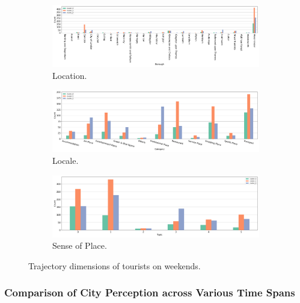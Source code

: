 \documentclass{article}
\theoremstyle{remark}
\begin{document}
\begin{figure}[!h]

\centering
\begin{subfigure}{0.6\textheight}
\centering
\includegraphics[width=1\linewidth]{figures/traj_location_weekend_tourists.png}
\caption{Location.}
\label{fig:traj_location_weekend_tourists}
\end{subfigure}
\begin{subfigure}{0.6\textheight}
\centering
\includegraphics[width=1\linewidth]{figures/traj_locale_weekend_tourists.png}
\caption{Locale.}
\label{fig:traj_locale_weekend_tourists}
\end{subfigure}
\begin{subfigure}{0.6\textheight}
\centering
\includegraphics[width=1\linewidth]{figures/traj_sense_weekend_tourists.png}
\caption{Sense of Place.}
\label{fig:traj_sense_weekend_tourists}
\end{subfigure}

\caption{Trajectory dimensions of tourists on weekends.}
\label{fig:traj_dimension_weekend_tourists}
\end{figure}

\subsubsection{Comparison of City Perception across Various Time Spans} \label{comparison_perception}
\end{document}
